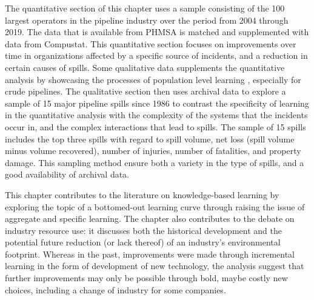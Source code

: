 The quantitative section of this chapter uses a sample consisting of the 100 largest operators in the pipeline industry over the period from 2004 through 2019. The data that is available from PHMSA is matched and supplemented with data from Compustat. This quantitative section focuses on improvements over time in organizations affected by a specific source of incidents, and a reduction in certain causes of spills. Some qualitative data supplements the quantitative analysis by showcasing the processes of population level learning \citep{Miner1999}, especially for crude pipelines. The qualitative section then uses archival data to explore a sample of 15 major pipeline spills since 1986 to contrast the specificity of learning in the quantitative analysis with the complexity of the systems that the incidents occur in, and the complex interactions that lead to spills. The sample of 15 spills includes the top three spills with regard to spill volume, net loss (spill volume minus volume recovered), number of injuries, number of fatalities, and property damage. This sampling method ensure both a variety in the type of spills, and a good availability of archival data.

This chapter contributes to the literature on knowledge-based learning by exploring the topic of a bottomed-out learning curve through raising the issue of aggregate and specific learning. The chapter also contributes to the debate on industry resource use: it discusses both the historical development and the potential future reduction (or lack thereof) of an industry's environmental footprint. Whereas in the past, improvements were made through incremental learning in the form of development of new technology, the analysis suggest that further improvements may only be possible through bold, maybe costly new choices, including a change of industry for some companies.



